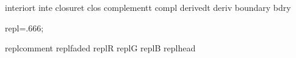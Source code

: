 \def\derived#1{#1'}
\def\boundary#1{#1'}
\def\interior#1{#1^\smile}
\def\closure#1{#1^\frown}
\let\deri=\derived
\let\inte=\interior
\let\clos=\closure
\let\cmpl=\compl
\DefOP interiort   inte
\DefOP closuret    clos
\DefOP complementt compl
\DefOP derivedt    deriv
\DefOP boundary    bdry
\def\topobyns#1{\cal O_{#1}}%
\def\hoodsofp#1#2{{#1}\funparen{#2}}%
\def\toposep#1{{\ensuremath{\mathrm T_{#1}}}}
\def\subtopo{\leq}
\def\hoodscross{\otimes}
\def\topocross{\times}


\Newskip repl=.666\bigskipamount;

\DefStyle replcomment {\color{faded}}
\DefStyle replfaded {\color{faded}}
\DefStyle replR {\aRstyle}
\DefStyle replG {\aGstyle}
\DefStyle replB {\aBstyle}
\DefStyle replhead {\sfbf}

\def\replalertstyle{\ifreplignorealerts\else\alertstyle\fi}

\newcount\repllineno
\newif\ifrepllabline
\newif\ifreplhidelineno
\newif\ifreplmath
\newif\ifreplalert
\newif\ifreplcross
\newif\ifreplmeaning
\newif\ifreplcomputation
\newif\ifreplcontinuation
\newif\ifreplskipcount
\newif\ifreplignorealerts
\newif\ifreplphantom
\newif\ifreplhide


\def\replhandleopts#1{%
\def\thisrepllinestyles{}%
\WhenStrContains{#1}{-}{\addto\thisrepllinestyles{\replcommentstyle}}%
\WhenStrContains{#1}{a}{\replalerttrue\addto\thisrepllinestyles{\replalertstyle}}%
\WhenStrContains{#1}{f}{\addto\thisrepllinestyles{\replfadedstyle}}%
\WhenStrContains{#1}{R}{\addto\thisrepllinestyles{\replRstyle}}%
\WhenStrContains{#1}{G}{\addto\thisrepllinestyles{\replGstyle}}%
\WhenStrContains{#1}{B}{\addto\thisrepllinestyles{\replBstyle}}%
\WhenStrContains{#1}{c}{\replcomputationtrue}%
\WhenStrContains{#1}{,}{\replcontinuationtrue}%
\WhenStrContains{#1}{t}{\addto\thisrepllinestyles{\replmathfalse}}%
\WhenStrContains{#1}{m}{\addto\thisrepllinestyles{\replmathtrue}}%
\WhenStrContains{#1}{/}{\addto\thisrepllinestyles{\replcrosstrue}}%
\WhenStrContains{#1}{=}{\addto\thisrepllinestyles{\replmeaningtrue}}%
\WhenStrContains{#1}{x}{\replphantomtrue}%
\WhenStrContains{#1}{X}{\replhidetrue}%
}

